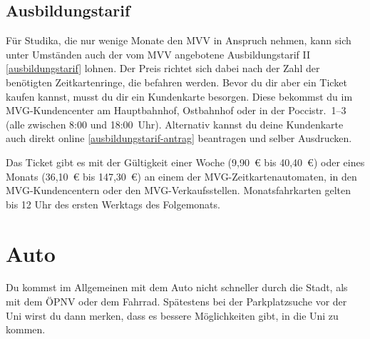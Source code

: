 \begin{urlList}
\end{urlList}

\subsection*{Ausbildungstarif}
Für Studika, die nur wenige Monate den MVV in Anspruch nehmen, kann sich unter
Umständen auch der vom MVV angebotene Ausbildungstarif II
\ref{ausbildungstarif} lohnen. Der Preis richtet sich dabei nach der Zahl der
benötigten Zeitkartenringe, die befahren werden. Bevor du dir aber ein Ticket
kaufen kannst, musst du dir ein Kundenkarte besorgen. Diese bekommst du im
MVG-Kundencenter am Hauptbahnhof, Ostbahnhof oder in der \mbox{Poccistr.}~1--3 (alle
zwischen 8:00 und 18:00~Uhr). Alternativ kannst du deine Kundenkarte auch
direkt online \ref{ausbildungstarif-antrag} beantragen und selber Ausdrucken.

Das Ticket gibt es mit der Gültigkeit einer Woche (9,90~€ bis 40,40~€) oder eines Monats (36,10~€ bis 147,30~€) an einem der MVG-Zeitkartenautomaten, in den MVG-Kundencentern oder den MVG-Verkaufsstellen. Monatsfahrkarten gelten bis 12 Uhr des ersten Werktags des Folgemonats.

\begin{urlList}
\end{urlList}

\section{Auto}
Du kommst im Allgemeinen mit dem Auto nicht schneller durch die Stadt, als mit dem ÖPNV oder dem Fahrrad. Spätestens bei der Parkplatzsuche vor der Uni wirst du dann merken, dass es bessere Möglichkeiten gibt, in die Uni zu kommen.
